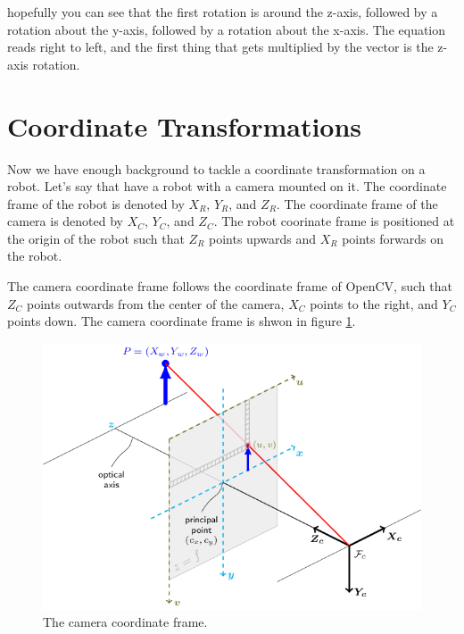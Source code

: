\documentclass[11pt]{article}
\begin{document}
hopefully you can see that the first rotation is around the z-axis, followed by a rotation
about the y-axis, followed by a rotation about the x-axis.  The equation reads right
to left, and the first thing that gets multiplied by the vector is the z-axis rotation.


\section{Coordinate Transformations}
\label{sec:transformations}

Now we have enough background to tackle a coordinate transformation on a robot.  Let’s say  
that have a robot with a camera mounted on it.  The coordinate frame of the robot is denoted
by $X_R$, $Y_R$, and $Z_R$.  The coordinate frame of the camera is denoted by $X_C$, $Y_C$,
and $Z_C$.  The robot coorinate frame is positioned at the origin of the robot such that
$Z_R$ points upwards and $X_R$ points forwards on the robot.

The camera coordinate frame follows the coordinate frame of OpenCV, such that $Z_C$ points
outwards from the center of the camera, $X_C$ points to the right, and $Y_C$ points down.  The
camera coordinate frame is shwon in figure \ref{fig:pinhole_camera_model}.

\begin{figure}[h!]
    \centering
    \includegraphics[scale=0.5]{figures/pinhole_camera_model.png}
    \caption{The camera coordinate frame.}
    \label{fig:pinhole_camera_model}
\end{figure}
\end{document}
